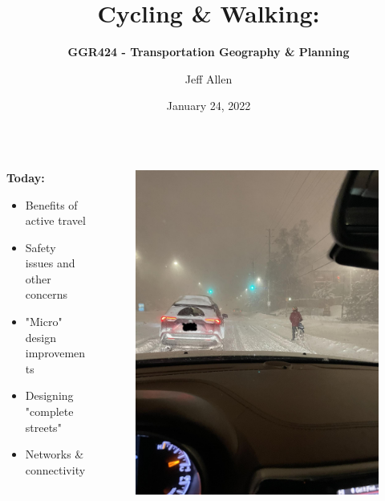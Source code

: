 \documentclass[aspectratio=169]{beamer}
\title{\textbf{Cycling \& Walking:}}
\subtitle{\textbf{GGR424 - Transportation Geography \& Planning}}
\author{Jeff Allen}
\institute{University of Toronto}
\date{January 24, 2022}
\begin{document}
	
\begin{frame}
	\titlepage	
\end{frame}




\begin{frame}
	\begin{columns}
		\begin{column}{0.5\textwidth}
			
			\textbf{Today:}
			\begin{itemize}
				\item Benefits of active travel
				
				\item Safety issues and other concerns
				
				\item "Micro" design improvements
				
				\item Designing "complete streets"
				
				\item Networks \& connectivity
			\end{itemize}
			
		\end{column}
		
		\begin{column}{0.5\textwidth}
			\begin{figure}
				\centering
				\includegraphics[width=0.8\linewidth]{images/bike_winter.jpg}
			\end{figure}
			
		\end{column}
		
		
		
	\end{columns}
\end{frame}
\end{document}
